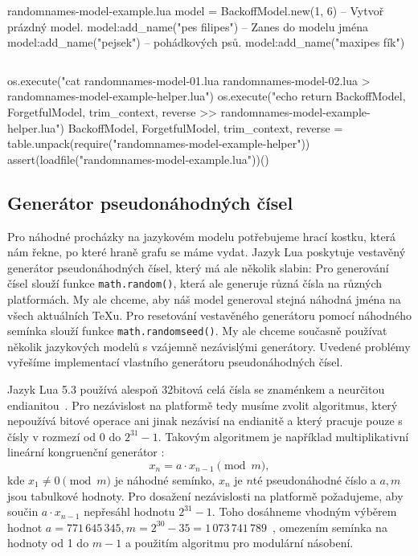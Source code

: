 \documentclass{csbulletin}
\newcommand\myinputminted[3][]{%
  \inputminted[#1]{#2}{#3}%
}
\newcommand\myinputminted[3][]{%
  \inputminted[#1]{#2}{code-placeholder.#2}%
}
\begin{document}
\begin{filecontents}{randomnames-model-example.lua}
model = BackoffModel.new(1, 6)        -- Vytvoř prázdný model.
model:add_name("pes filipes")         -- Zanes do modelu jména
model:add_name("pejsek")              -- pohádkových psů.
model:add_name("maxipes fík")
\end{filecontents}
\myinputminted[linenos=false]{lua}{randomnames-model-example.lua}

\noindent
\begin{luacode*}
os.execute("cat randomnames-model-01.lua randomnames-model-02.lua > randomnames-model-example-helper.lua")
os.execute("echo return {BackoffModel, ForgetfulModel, trim_context, reverse} >> randomnames-model-example-helper.lua")
BackoffModel, ForgetfulModel, trim_context, reverse = table.unpack(require("randomnames-model-example-helper"))
assert(loadfile("randomnames-model-example.lua"))()
\end{luacode*}

\subsection{Generátor pseudonáhodných čísel}
\label{sec:implementace-random}

Pro náhodné procházky na jazykovém modelu potřebujeme hrací kostku, která nám řekne, po které hraně grafu se máme vydat. Jazyk Lua poskytuje vestavěný generátor pseudonáhodných čísel, který má ale několik slabin: Pro generování čísel slouží funkce \texttt{math.random()}, která ale generuje různá čísla na různých platformách. My ale chceme, aby náš model generoval stejná náhodná jména na všech aktuálních \TeX u. Pro resetování vestavěného generátoru pomocí náhodného semínka slouží funkce \texttt{math.randomseed()}. My ale chceme současně používat několik jazykových modelů s vzájemně nezávislými generátory. Uvedené problémy vyřešíme implementací vlastního generátoru pseudonáhodných čísel.

Jazyk Lua 5.3 používá alespoň 32bitová celá čísla se znaménkem a neurčitou endianitou~\cite[sekce~2.1]{ierusalimschy2020lua}. Pro nezávislost na platformě tedy musíme zvolit algoritmus, který nepoužívá bitové operace ani jinak nezávisí na endianitě a který pracuje pouze s čísly v rozmezí od 0 do $2^{31} - 1$. Takovým algoritmem je například multiplikativní lineární kongruenční generátor \cite[sekce~7.1]{press2007numerical}:
\begin{equation}
x_n = a\cdot x_{n-1}\pmod{m},
\end{equation}
kde $x_1\neq0\pmod{m}$ je náhodné semínko, $x_n$ je $n$té pseudonáhodné číslo a $a, m$ jsou tabulkové hodnoty.
Pro dosažení nezávislosti na platformě požadujeme, aby součin $a\cdot x_{n-1}$ nepřesáhl hodnotu $2^{31} - 1$. Toho dosáhneme vhodným výběrem hodnot $a = 771\,645\,345, m = 2^{30} - 35 = 1\,073\,741\,789$~\cite[tabulka~2]{l1999tables}, omezením semínka na hodnoty od 1 do $m - 1$ a použitím algoritmu pro modulární násobení.
\end{document}
